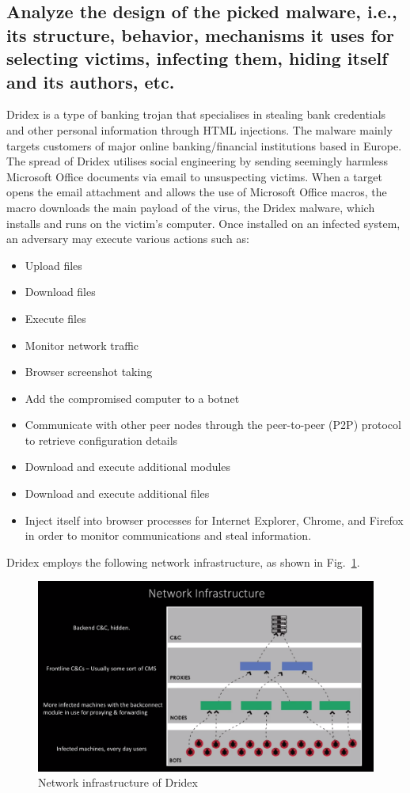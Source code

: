 \documentclass[conference]{IEEEtran}
\begin{document}
\subsection{Analyze the design of the picked malware, i.e., its structure, behavior, mechanisms it uses for selecting victims, infecting them, hiding itself and its authors, etc.}
Dridex is a type of banking trojan that specialises in stealing bank credentials and other personal information through HTML injections. The malware mainly targets customers of major online banking/financial institutions based in Europe. The spread of Dridex utilises social engineering by sending seemingly harmless Microsoft Office documents via email to unsuspecting victims. When a target opens the email attachment and allows the use of Microsoft Office macros, the macro downloads the main payload of the virus, the Dridex malware, which installs and runs on the victim’s computer. Once installed on an infected system, an adversary may execute various actions such as:
\begin{itemize}
\item Upload files
\item Download files
\item Execute files
\item Monitor network traffic
\item Browser screenshot taking
\item Add the compromised computer to a botnet
\item Communicate with other peer nodes through the peer-to-peer (P2P) protocol to retrieve configuration details
\item Download and execute additional modules
\item Download and execute additional files
\item Inject itself into browser processes for Internet Explorer, Chrome, and Firefox in order to monitor communications and steal
 information.
\end{itemize}
Dridex employs the following network infrastructure, as shown in Fig.~\ref{fg1}.
\begin{figure}[h]
\centerline{\includegraphics[width=\textwidth]{img/dridex_network_infrastructure.png}}
\caption{Network infrastructure of Dridex}
\label{fg1}
\end{figure}
\end{document}
